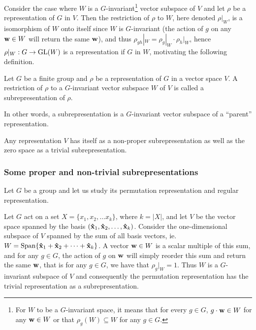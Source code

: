 Consider the case where $W$ is a $G$-invariant\footnote{For $W$ to be a $G$-invariant space, it means that for every $g \in G$, $g \cdot \mathbf{w} \in W$ for any $\mathbf{w} \in W$ or that $\rho_g(W) \subseteq W$ for any $g\in G$.} vector subspace of $V$%
and let $\rho$ be a representation of $G$ in $V$. Then the restriction of $\rho$ to $W$, here denoted $\rho|_W$, is a isomorphism of $W$ onto itself since $W$ is $G$-invariant (the action of $g$ on any $\mathbf{w} \in W$ will return the same $\mathbf{w}$), and thus $\rho_{gh}|_W = \rho_g|_W \cdot \rho_h|_W$, hence $\rho|_W: G \rightarrow \text{GL}(W)$ is a representation if $G$ in $W$, motivating the following definition.

\begin{definition}[Subrepresentation]\label{def:subrepr}
	Let $G$ be a finite group and $\rho$ be a representation of $G$ in a vector space $V$. A restriction of $\rho$ to a $G$-invariant vector subspace $W$ of $V$ is called a subrepresentation of $\rho$.
\end{definition}

In other words, a subrepresentation is a $G$-invariant vector subspace of a ``parent'' representation. 

\begin{example}
	Any representation $V$ has itself as a non-proper subrepresentation as well as the zero space as a trivial subrepresentation.
\end{example}

\subsubsection{Some proper and non-trivial subrepresentations}

Let $G$ be a group and let us study its permutation representation and regular representation. 

\begin{example}\cite[Example 1.4.3.]{Sagan}\label{example:trivpermrepr}
	Let $G$ act on a set $X = \{x_1, x_2, \dots x_k\}$, where $k = |X|$, and let $V$ be the vector space spanned by the basis $(\mathbf{\hat{x}}_1, \mathbf{\hat{x}}_2, \dots, \mathbf{\hat{x}}_k)$. Consider the one-dimensional subspace of $V$ spanned by the sum of all basis vectors, ie. $W = \text{Span}\{ \mathbf{\hat{x}}_1 + \mathbf{\hat{x}}_2 + \dots + \mathbf{\hat{x}}_k \}$. A vector $\mathbf{w} \in W$ is a scalar multiple of this sum, and for any $g \in G$, the action of $g$ on $\mathbf{w}$ will simply reorder this sum and return the same $\mathbf{w}$, that is for any $g \in G$, we have that $\rho_g|_W = 1$. Thus $W$ is a $G$-invariant subspace of $V$ and consequently the permutation representation has the trivial representation as a subrepresentation.
\end{example}

